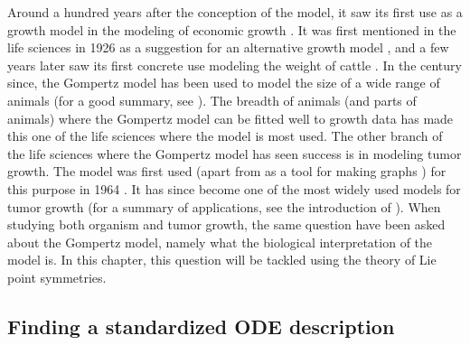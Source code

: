 Around a hundred years after the conception of the model, it saw its first use as a growth model in the modeling of economic growth \cite{prescott1922demand,peabody1924railway}.
It was first mentioned in the life sciences in 1926 as a suggestion for an alternative growth model \cite{wright1926reviews}, and a few years later saw its first concrete use modeling the weight of cattle \cite{davidson1928growth}.
In the century since, the Gompertz model has been used to model the size of a wide range of animals (for a good summary, see \cite{tjorve2017gompertz}).
The breadth of animals (and parts of animals) where the Gompertz model can be fitted well to growth data has made this one of the life sciences where the model is most used.
The other branch of the life sciences where the Gompertz model has seen success is in modeling tumor growth.
The model was first used (apart from as a tool for making graphs \cite{casey1934alteration}) for this purpose in 1964 \cite{laird1964dynamics}.
It has since become one of the most widely used models for tumor growth \cite{gerlee2013muddle} (for a summary of applications, see the introduction of \cite{benzekry2014classical}).
When studying both organism and tumor growth, the same question have been asked about the Gompertz model, namely what the biological interpretation of the model is.
In this chapter, this question will be tackled using the theory of Lie point symmetries.

\subsection{Finding a standardized ODE description}

